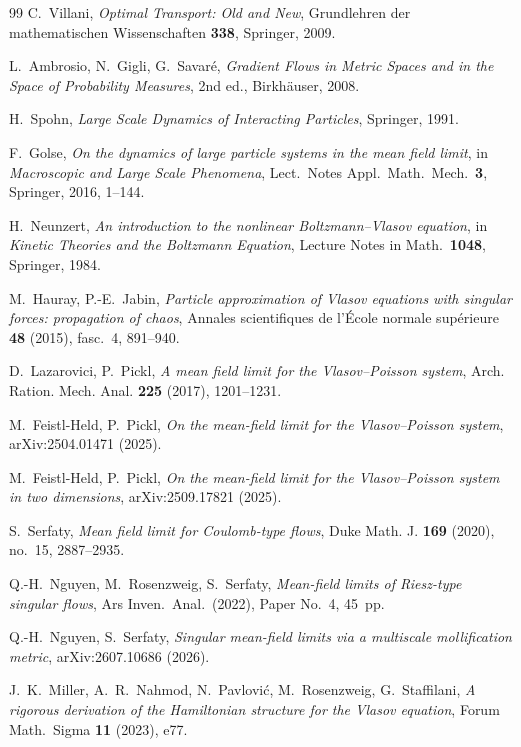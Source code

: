 \documentclass[11pt]{article}
\theoremstyle{plain}
\theoremstyle{definition}
\theoremstyle{remark}
\begin{document}
\begin{thebibliography}{99}
 C.~Villani, \emph{Optimal Transport: Old and New},
  Grundlehren der mathematischen Wissenschaften \textbf{338}, Springer, 2009.

 L.~Ambrosio, N.~Gigli, G.~Savar\'e, \emph{Gradient Flows in Metric
  Spaces and in the Space of Probability Measures}, 2nd ed., Birkh\"auser, 2008.

 H.~Spohn,
  \emph{Large Scale Dynamics of Interacting Particles}, Springer, 1991.

 F.~Golse, \emph{On the dynamics of large particle systems in the
  mean field limit}, in \emph{Macroscopic and Large Scale Phenomena}, Lect.\
  Notes Appl.\ Math.\ Mech.\ \textbf{3}, Springer, 2016, 1--144.

 H.~Neunzert, \emph{An introduction to the nonlinear
  Boltzmann--Vlasov equation}, in \emph{Kinetic Theories and the Boltzmann
  Equation}, Lecture Notes in Math.\ \textbf{1048}, Springer, 1984.

M.~Hauray, P.-E.~Jabin,
\emph{Particle approximation of Vlasov equations with singular forces: propagation of chaos},
Annales scientifiques de l'\'Ecole normale sup\'erieure \textbf{48} (2015), fasc.~4, 891--940.

D.~Lazarovici, P.~Pickl,
\emph{A mean field limit for the Vlasov--Poisson system},
Arch. Ration. Mech. Anal. \textbf{225} (2017), 1201--1231.

M.~Feistl-Held, P.~Pickl,
\emph{On the mean-field limit for the Vlasov--Poisson system},
arXiv:2504.01471 (2025).

M.~Feistl-Held, P.~Pickl,
\emph{On the mean-field limit for the Vlasov--Poisson system in two dimensions},
arXiv:2509.17821 (2025).

S.~Serfaty,
\emph{Mean field limit for Coulomb-type flows},
Duke Math. J. \textbf{169} (2020), no.~15, 2887--2935.

Q.-H.~Nguyen, M.~Rosenzweig, S.~Serfaty,
\emph{Mean-field limits of Riesz-type singular flows},
Ars Inven.\ Anal.\ (2022), Paper No.~4, 45~pp.

Q.-H.~Nguyen, S.~Serfaty,
\emph{Singular mean-field limits via a multiscale mollification metric},
arXiv:2607.10686 (2026).

 J.~K.~Miller, A.~R.~Nahmod, N.~Pavlovi\'c, M.~Rosenzweig,
  G.~Staffilani, \emph{A rigorous derivation of the Hamiltonian structure for the
  Vlasov equation}, Forum Math.\ Sigma \textbf{11} (2023), e77.

\end{thebibliography}
\end{document}
